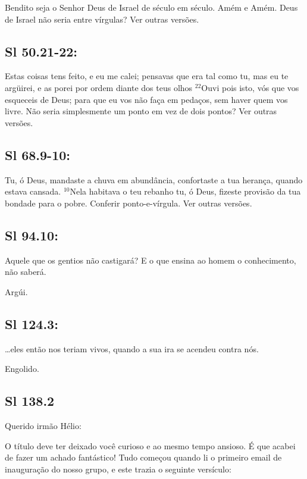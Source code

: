 Bendito seja o Senhor Deus de Israel de século em século. Amém e Amém.
Deus de Israel não seria entre vírgulas? Ver outras versões. 

\subsection{Sl 50.21-22:}

 Estas coisas tens feito, e eu me calei; pensavas que era tal como tu, mas eu te argüirei, e as porei por ordem diante dos teus olhos\uwave{:} $^{\mathrm{22}}$Ouvi pois isto, vós que vos esqueceis de Deus; para que eu vos não faça em pedaços, sem haver quem vos livre.
Não seria simplesmente um ponto em vez de dois pontos? Ver outras versões. 

\subsection{Sl 68.9-10:}

 Tu, ó Deus, mandaste a chuva em abundância, confortaste a tua herança, quando estava cansada. $^{\mathrm{10}}$Nela habitava o teu rebanho\uwave{;} tu, ó Deus, fizeste provisão da tua bondade para o pobre.
Conferir ponto-e-vírgula. Ver outras versões. 

\subsection{Sl 94.10:}

 Aquele que  os gentios não castigará? E o que ensina ao homem o conhecimento, não saberá.
 
Argúi.

\subsection{Sl 124.3:}

 \ldots eles então nos teriam  vivos, quando a sua ira se acendeu contra nós.

Engolido.

\subsection{Sl 138.2}

Querido irmão Hélio:

O título deve ter deixado você curioso e ao mesmo tempo ansioso. É que acabei de fazer um achado fantástico! Tudo começou quando li o primeiro email de inauguração do nosso grupo, e este trazia o seguinte versículo:

